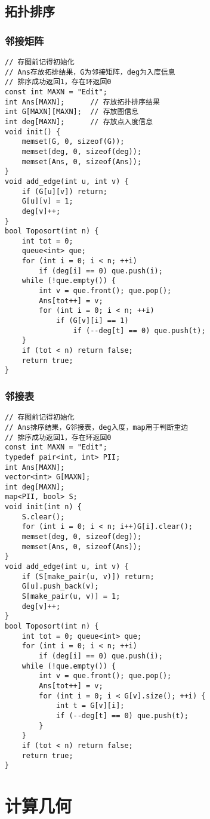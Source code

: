 \documentclass[a4paper]{article}
\begin{document}
\subsection{拓扑排序}
\subsubsection{邻接矩阵}
\begin{lstlisting}
// 存图前记得初始化
// Ans存放拓排结果，G为邻接矩阵，deg为入度信息
// 排序成功返回1，存在环返回0
const int MAXN = "Edit";
int Ans[MAXN];		// 存放拓扑排序结果
int G[MAXN][MAXN];	// 存放图信息
int deg[MAXN];		// 存放点入度信息
void init() {
	memset(G, 0, sizeof(G));
	memset(deg, 0, sizeof(deg));
	memset(Ans, 0, sizeof(Ans));
}
void add_edge(int u, int v) {
	if (G[u][v]) return;
	G[u][v] = 1;
	deg[v]++;
}
bool Toposort(int n) {
	int tot = 0;
	queue<int> que;
	for (int i = 0; i < n; ++i)
		if (deg[i] == 0) que.push(i);
	while (!que.empty()) {
		int v = que.front(); que.pop();
		Ans[tot++] = v;
		for (int i = 0; i < n; ++i)
			if (G[v][i] == 1)
				if (--deg[t] == 0) que.push(t);
	}
	if (tot < n) return false;
	return true;
}
\end{lstlisting}
\subsubsection{邻接表}
\begin{lstlisting}
// 存图前记得初始化
// Ans排序结果，G邻接表，deg入度，map用于判断重边
// 排序成功返回1，存在环返回0
const int MAXN = "Edit";
typedef pair<int, int> PII;
int Ans[MAXN];
vector<int> G[MAXN];
int deg[MAXN];
map<PII, bool> S;
void init(int n) {
	S.clear();
	for (int i = 0; i < n; i++)G[i].clear();
	memset(deg, 0, sizeof(deg));
	memset(Ans, 0, sizeof(Ans));
}
void add_edge(int u, int v) {
	if (S[make_pair(u, v)]) return;
	G[u].push_back(v);
	S[make_pair(u, v)] = 1;
	deg[v]++;
}
bool Toposort(int n) {
	int tot = 0; queue<int> que;
	for (int i = 0; i < n; ++i)
		if (deg[i] == 0) que.push(i);
	while (!que.empty()) {
		int v = que.front(); que.pop();
		Ans[tot++] = v;
		for (int i = 0; i < G[v].size(); ++i) {
			int t = G[v][i];
			if (--deg[t] == 0) que.push(t);
		}
	}
	if (tot < n) return false;
	return true;
}
\end{lstlisting}
\clearpage
\section{计算几何}
\end{document}
